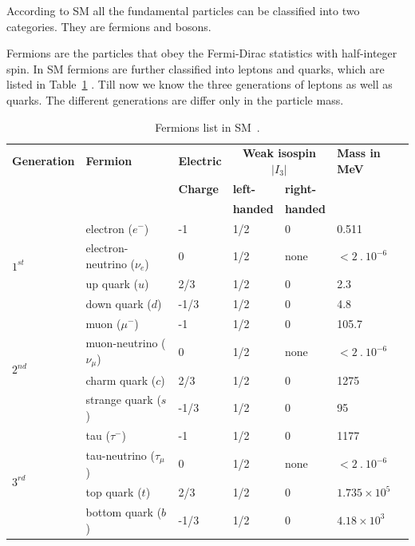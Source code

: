 According to SM all the fundamental particles can be classified into two categories. They are fermions and bosons.

Fermions are the particles that obey the Fermi-Dirac statistics with half-integer spin. In SM fermions are further classified into leptons and quarks, which are listed in Table~\ref{table:smfermions} . Till now we know the three generations of leptons as well as quarks. The different generations are differ only in the particle mass.
\begin{table}
\centering
\begin{tabular}[!htbp]{l l l l l l}
\hline
{\textbf{Generation}} & {\textbf{Fermion}} & {\textbf{Electric}} & \multicolumn{2}{c}{\textbf{Weak isospin $|I_3|$}} & \textbf{Mass in MeV} \\
    &           &    \textbf{Charge}  & \textbf{left-} & \textbf{right-} &     \\
    &           &                     & \textbf{handed} & \textbf{handed} &    \\
\hline
\multirow{4}{*}{$1^{st}$} & electron ($e^-$)           &   -1 & 1/2 &  0    &   0.511 \\
         & electron-neutrino ($\nu_e$)&   0  & 1/2 &  none &   $<2~.~10^{-6}$   \\
         & up quark ($u$)             &  2/3 & 1/2 &  0    &   2.3  \\
         & down quark ($d$)           & -1/3 & 1/2 &  0    &   4.8  \\
\hline
\multirow{4}{*}{$2^{nd}$} & muon ($\mu^-$)             &  -1  & 1/2 &  0    &   105.7 \\
         & muon-neutrino ($\nu_{\mu}$)& 0    & 1/2 &  none &   $<2~.~10^{-6}$   \\
         & charm quark ($c$)                & 2/3  & 1/2 &  0    &   1275     \\
         & strange quark ($s$)              & -1/3 & 1/2 &  0    &   95       \\
\hline
\multirow{4}{*}{$3^{rd}$} & tau ($\tau^-$)             & -1   & 1/2 &  0    &    1177    \\
         & tau-neutrino ($\tau_{\mu}$)& 0    & 1/2 &  none &   $<2~.~10^{-6}$   \\
         & top quark ($t$)                  & 2/3  & 1/2 &  0    &   $1.735\times 10^5$\\
         & bottom quark ($b$)               & -1/3 & 1/2 &  0    &   $4.18 \times 10^3$\\
\hline
\end{tabular}
\caption{Fermions list in SM~\cite{Bittrich2012}.}
\label{table:smfermions}
\end{table}

